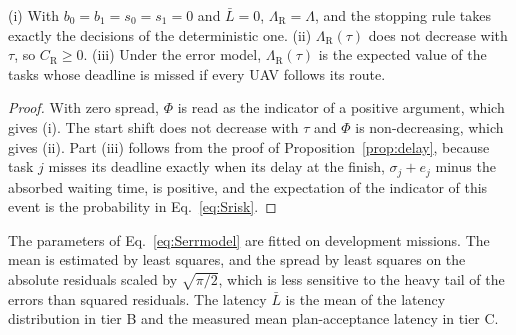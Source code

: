 \begin{prop}\label{prop:risk}
(i) With $b_0=b_1=s_0=s_1=0$ and $\bar L=0$, $\Lambda_{\mathrm{R}}=\Lambda$, and the stopping rule takes exactly the
decisions of the deterministic one. (ii) $\Lambda_{\mathrm{R}}(\tau)$ does not decrease with $\tau$, so $C_{\mathrm{R}}\ge0$.
(iii) Under the error model, $\Lambda_{\mathrm{R}}(\tau)$ is the expected value of the tasks whose deadline is missed if
every UAV follows its route.
\end{prop}
\begin{proof}
With zero spread, $\Phi$ is read as the indicator of a positive argument, which gives (i). The start shift does not
decrease with $\tau$ and $\Phi$ is non-decreasing, which gives (ii). Part (iii) follows from the proof of
Proposition~\ref{prop:delay}, because task $j$ misses its deadline exactly when its delay at the finish,
$\sigma_j+e_j$ minus the absorbed waiting time, is positive, and the expectation of the indicator of this event is the
probability in Eq.~\eqref{eq:Srisk}.
\end{proof}

The parameters of Eq.~\eqref{eq:Serrmodel} are fitted on development missions. The mean is estimated by least squares,
and the spread by least squares on the absolute residuals scaled by $\sqrt{\pi/2}$, which is less sensitive to the heavy
tail of the errors than squared residuals. The latency $\bar L$ is the mean of the latency distribution in tier B and
the measured mean plan-acceptance latency in tier C.

